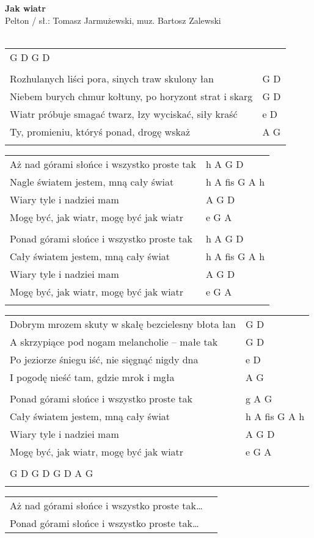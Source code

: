 \documentclass[a5paper]{article}
\begin{document}


\noindent
\fontsize{12pt}{15pt}\selectfont
\textbf{Jak wiatr} \\
\fontsize{8pt}{10pt}\selectfont
Pelton / sł.: Tomasz Jarmużewski, muz. Bartosz Zalewski \\ \\
\fontsize{10pt}{12pt}\selectfont
{}
\begin{tabular}{@{}p{8.50cm}p{3cm}@{}}
\noindent
G D G D \\ \\

Rozhulanych liści pora, sinych traw skulony łan & G D \\
Niebem burych chmur kołtuny, po horyzont strat i skarg & G D \\
Wiatr próbuje smagać twarz, łzy wyciskać, siły kraść & e D \\
Ty, promieniu, któryś ponad, drogę wskaż & A G \\ \\
\end{tabular}

\noindent
\begin{tabular}{@{}p{7.50cm}p{3cm}@{}}
Aż nad górami słońce i wszystko proste tak & h A G D \\
Nagle światem jestem, mną cały świat & h A fis G A h \\
Wiary tyle i nadziei mam & A G D \\
Mogę być, jak wiatr, mogę być jak wiatr & e G A \\ \\
 
Ponad górami słońce i wszystko proste tak & h A G D \\
Cały światem jestem, mną cały świat & h A fis G A h \\
Wiary tyle i nadziei mam & A G D \\
Mogę być, jak wiatr, mogę być jak wiatr & e G A \\ \\
\end{tabular}

\noindent
\begin{tabular}{@{}p{8.50cm}p{3cm}@{}} 
Dobrym mrozem skuty w skałę bezcielesny błota łan & G D \\
A skrzypiące pod nogam melancholie – małe tak & G D \\
Po jeziorze śniegu iść, nie sięgnąć nigdy dna & e D \\
I pogodę nieść tam, gdzie mrok i mgła & A G \\ \\
 
Ponad górami słońce i wszystko proste tak & g A G \\
Cały światem jestem, mną cały świat & h A fis G A h \\
Wiary tyle i nadziei mam & A G D \\
Mogę być, jak wiatr, mogę być jak wiatr & e G A \\ \\
G D G D G D A G \\ \\
\end{tabular}

\noindent
\begin{tabular}{@{}p{7.50cm}p{3cm}@{}}
Aż nad górami słońce i wszystko proste tak… \\
Ponad górami słońce i wszystko proste tak… \\
\end{tabular}
\end{document}
